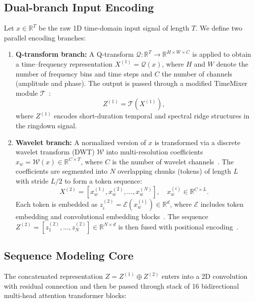 \documentclass[prd,aps,a4paper,twocolumn,superscriptaddress,nofootinbib,floatfix]{revtex4-2}
\begin{document}
\subsection{Dual-branch Input Encoding}
\label{app:dual_branch_input}
Let $x \in \mathbb{R}^{T}$ be the raw 1D time-domain input signal of length $T$. We define two parallel encoding branches:

\begin{enumerate}
    \item \textbf{Q-transform branch:} A Q-transform $\mathcal{Q}: \mathbb{R}^{T} \to \mathbb{R}^{H \times W \times C}$ is applied to obtain a time–frequency representation $X^{(1)} = \mathcal{Q}(x)$, where $H$ and $W$ denote the number of frequency bins and time steps and $C$ the number of channels (amplitude and phase). The output is passed through a modified TimeMixer module $\mathcal{T}$~\cite{wang2025timemixergeneraltimeseries}:
    \begin{equation}
        Z^{(1)} = \mathcal{T}(X^{(1)}),
    \end{equation}
    where $Z^{(1)}$ encodes short-duration temporal and spectral ridge structures in the ringdown signal.  
    \item \textbf{Wavelet branch:} A normalized version of $x$ is transformed via a discrete wavelet transform (DWT) $\mathcal{W}$ into multi-resolution coefficients $x_{w} = \mathcal{W}(x) \in \mathbb{R}^{C \times T}$, where $C$ is the number of wavelet channels~\cite{MALLAT199942}. The coefficients are segmented into $N$ overlapping chunks (tokens) of length $L$ with stride $L/2$ to form a token sequence\cite{nie2023timeseriesworth64}:
    \begin{equation}
        X^{(2)} = [x_{w}^{(1)}, x_{w}^{(2)}, \dots, x_{w}^{(N)}], \quad x_{w}^{(i)} \in \mathbb{R}^{C \times L}.
    \end{equation}
    Each token is embedded as $z_{i}^{(2)} = \mathcal{E}(x_{w}^{(i)}) \in \mathbb{R}^{d}$, where $\mathcal{E}$ includes token embedding and convolutional embedding blocks~\cite{Mao:2025cae, Xu_2024}. The sequence $Z^{(2)} = [z_1^{(2)}, \dots, z_N^{(2)}] \in \mathbb{R}^{N \times d}$ is then fused with positional encoding~\cite{vaswani2023attentionneed}.  
\end{enumerate}

\subsection{Sequence Modeling Core}
\label{app:sequence_core}
The concatenated representation $Z = Z^{(1)} \oplus Z^{(2)}$ enters into a 2D convolution with residual connection and then be passed through stack of 16 bidirectional multi-head attention transformer blocks:
\cite{devlin2019bertpretrainingdeepbidirectional,xiong2020layernormalizationtransformerarchitecture}
\end{document}
